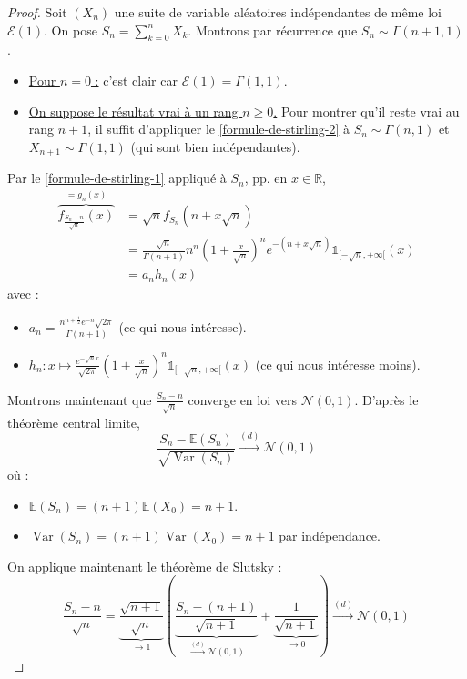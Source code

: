 	\begin{proof}
		Soit $(X_n)$ une suite de variable aléatoires indépendantes de même loi $\mathcal{E}(1)$. On pose $S_n = \sum_{k=0}^n X_k$. Montrons par récurrence que $S_n \sim \Gamma(n+1, 1)$.
		\begin{itemize}
			\item \uline{Pour $n = 0$ :} c'est clair car $\mathcal{E}(1) = \Gamma(1, 1)$.
			\item \uline{On suppose le résultat vrai à un rang $n \geq 0$.} Pour montrer qu'il reste vrai au rang $n+1$, il suffit d'appliquer le \cref{formule-de-stirling-2} à $S_n \sim \Gamma(n, 1)$ et $X_{n+1} \sim \Gamma(1, 1)$ (qui sont bien indépendantes).
		\end{itemize}
		Par le \cref{formule-de-stirling-1} appliqué à $S_n$, pp. en $x \in \mathbb{R}$,
		\begin{align*}
			\overbrace{f_{\frac{S_n - n}{\sqrt{n}}}(x)}^{= g_n(x)} & = \sqrt{n} f_{S_n} (n + x \sqrt{n}) \\
			& = \frac{\sqrt{n}}{\Gamma(n+1)} n^n \left(1 + \frac{x}{\sqrt{n}} \right)^n e^{-(n + x\sqrt{n})} \mathbb{1}_{[-\sqrt{n}, +\infty[}(x) \\
			& = a_n h_n(x)
		\end{align*}
		avec :
		\begin{itemize}
			\item $a_n = \frac{n^{n+\frac{1}{2}} e^{-n} \sqrt{2 \pi}}{\Gamma(n+1)}$ (ce qui nous intéresse).
			\item $h_n : x \mapsto \frac{e^{-\sqrt{n} x}}{\sqrt{2\pi}} \left( 1 + \frac{x}{\sqrt{n}} \right)^n \mathbb{1}_{[-\sqrt{n}, +\infty[}(x)$ (ce qui nous intéresse moins).
		\end{itemize}
		\medskip
		Montrons maintenant que $\frac{S_n - n}{\sqrt{n}}$ converge en loi vers $\mathcal{N}(0,1)$. D'après le théorème central limite,
		\[ \frac{S_n - \mathbb{E}(S_n)}{\sqrt{\operatorname{Var}(S_n)}} \overset{(d)}{\longrightarrow} \mathcal{N}(0,1) \]
		où :
		\begin{itemize}
			\item $\mathbb{E}(S_n) = (n+1) \mathbb{E}(X_0) = n+1$.
			\item $\operatorname{Var}(S_n) = (n+1) \operatorname{Var}(X_0) = n+1$ par indépendance.
		\end{itemize}
		On applique maintenant le théorème de Slutsky :
		\[ \frac{S_n - n}{\sqrt{n}} = \underbrace{\frac{\sqrt{n+1}}{\sqrt{n}}}_{\longrightarrow 1} \left( \underbrace{\frac{S_n - (n+1)}{\sqrt{n+1}}}_{\overset{(d)}{\longrightarrow} \mathcal{N}(0,1)} + \underbrace{\frac{1}{\sqrt{n+1}}}_{\longrightarrow 0} \right) \overset{(d)}{\longrightarrow} \mathcal{N}(0,1) \]

\end{proof}

